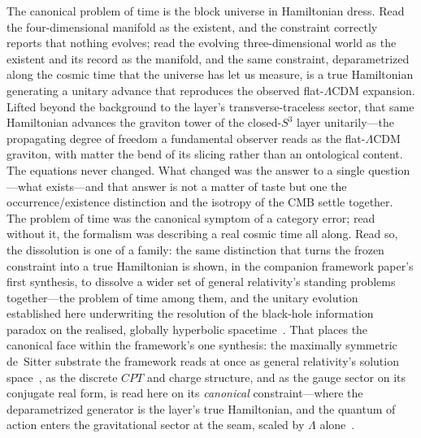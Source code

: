 \documentclass[11pt,a4paper]{article}
\theoremstyle{plain}
\theoremstyle{definition}
\theoremstyle{remark}
\begin{document}
The canonical problem of time is the block universe in Hamiltonian dress. Read the four-dimensional manifold as the existent, and the constraint correctly reports that nothing evolves; read the evolving three-dimensional world as the existent and its record as the manifold, and the same constraint, deparametrized along the cosmic time that the universe has let us measure, is a true Hamiltonian generating a unitary advance that reproduces the observed flat-$\Lambda$CDM expansion. Lifted beyond the background to the layer's transverse-traceless sector, that same Hamiltonian advances the graviton tower of the closed-$S^3$ layer unitarily---the propagating degree of freedom a fundamental observer reads as the flat-$\Lambda$CDM graviton, with matter the bend of its slicing rather than an ontological content. The equations never changed. What changed was the answer to a single question---what exists---and that answer is not a matter of taste but one the occurrence/existence distinction and the isotropy of the CMB settle together. The problem of time was the canonical symptom of a category error; read without it, the formalism was describing a real cosmic time all along. Read so, the dissolution is one of a family: the same distinction that turns the frozen constraint into a true Hamiltonian is shown, in the companion framework paper's first synthesis, to dissolve a wider set of general relativity's standing problems together---the problem of time among them, and the unitary evolution established here underwriting the resolution of the black-hole information paradox on the realised, globally hyperbolic spacetime~\cite{JanzenCRframework}. That places the canonical face within the framework's one synthesis: the maximally symmetric de~Sitter substrate the framework reads at once as general relativity's solution space~\cite{JanzenRange}, as the discrete $CPT$ and charge structure, and as the gauge sector on its conjugate real form, is read here on its \emph{canonical} constraint---where the deparametrized generator is the layer's true Hamiltonian, and the quantum of action enters the gravitational sector at the seam, scaled by $\Lambda$ alone~\cite{JanzenGeometricCore}.
\end{document}
